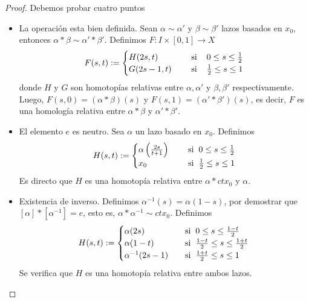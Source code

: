 \documentclass{article}
\begin{document}
\begin{proof}
    Debemos probar cuatro puntos
    \begin{itemize}
        \item La operación esta bien definida. Sean $\alpha\sim\alpha'$ y $\beta\sim\beta'$ lazos
        basados en $x_{0}$, entonces $\alpha*\beta\sim\alpha'*\beta'$. Definimos 
        $F:I\times[0,1]\to X$
        \begin{equation*}
            F(s,t):=\begin{cases}
                H(2s,t) &\quad\text{ si}\hspace{4mm}0\leq s\leq\frac{1}{2} \\
                G(2s-1,t) &\quad\text{ si}\hspace{4mm}\frac{1}{2}\leq s\leq1
            \end{cases}
        \end{equation*}
        donde $H$ y $G$ son homotopías relativas entre $\alpha, \alpha'$ y $\beta,\beta'$ 
        respectivamente. Luego, $F(s,0)=(\alpha*\beta)(s)$ y $F(s,1)=(\alpha'*\beta')(s)$, es 
        decir, $F$ es una homología relativa entre $\alpha*\beta$ y $\alpha'*\beta'$.

        \item El elemento $e$ es neutro. Sea $\alpha$ un lazo basado en $x_{0}$. Definimos
        \begin{equation*}
            H(s,t):=\begin{cases}
                \alpha\left(\frac{2s}{t+1}\right) 
                &\quad\text{ si}\hspace{2mm}0\leq s\leq\frac{1}{2} \\
                x_{0} &\quad\text{ si}\hspace{2mm}\frac{1}{2}\leq s\leq1
            \end{cases}
        \end{equation*}
        Es directo que $H$ es una homotopía relativa entre $\alpha*ctx_{0}$ y $\alpha$.

        \item Existencia de inverso. Definimos $\alpha^{-1}(s)=\alpha(1-s)$, por demostrar que
        $[\alpha]*[\alpha^{-1}]=e$, esto es, $\alpha*\alpha^{-1}\sim ctx_{0}$. Definimos
        \begin{equation*}
            H(s,t):=\begin{cases}
                \alpha(2s) &\quad\text{si}\hspace{2mm}0\leq s\leq\frac{1-t}{2} \\
                \alpha(1-t) &\quad\text{si}\hspace{2mm}\frac{1-t}{2} \leq s\leq\frac{1+t}{2} \\
                \alpha^{-1}(2s-1) &\quad\text{si}\hspace{2mm}\frac{1+t}{2}\leq s\leq1
            \end{cases}
        \end{equation*}
        Se verifica que $H$ es una homotopía relativa entre ambos lazos.


\end{itemize}
\end{proof}
\end{document}
